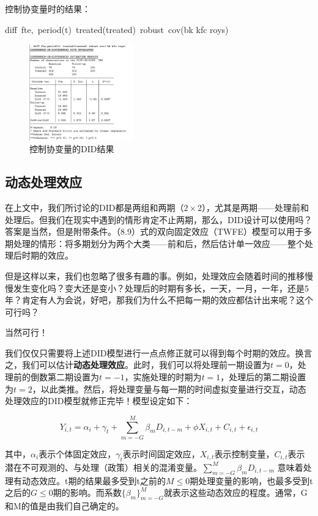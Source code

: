\documentclass[cn,12pt,math=newtx,citestyle=gb7714-2015,bibstyle=gb7714-2015]{elegantbook}
\begin{document}
	控制协变量时的结果：
	
	diff~fte,~period(t)~treated(treated)~robust~cov(bk kfc roys)
	\begin{figure}[htbp!]
		\centering
		\includegraphics[width=0.4\textwidth]{DIDcov.jpg}
		\caption{控制协变量的DID结果}\label{fig:digit}
	\end{figure}
	
	
	\subsection{动态处理效应}
	
	在上文中，我们所讨论的DID都是两组和两期（$2 \times 2$），尤其是两期——处理前和处理后。但我们在现实中遇到的情形肯定不止两期，那么，DID设计可以使用吗？答案是当然，但是附带条件。（8.9）式的双向固定效应（TWFE）模型可以用于多期处理的情形：将多期划分为两个大类——前和后，然后估计单一效应——整个处理后时期的效应。
	
	但是这样以来，我们也忽略了很多有趣的事。例如，处理效应会随着时间的推移慢慢发生变化吗？变大还是变小？处理后的时期有多长，一天，一月，一年，还是5年？肯定有人为会说，好吧，那我们为什么不把每一期的效应都估计出来呢？这个可行吗？
	
	当然可行！
	
	我们仅仅只需要将上述DID模型进行一点点修正就可以得到每个时期的效应。换言之，我们可以估计\textbf{动态处理效应}。此时，我们可以将处理前一期设置为$t=0$，处理前的倒数第二期设置为$t=-1$，实施处理的时期为$t=1$，处理后的第二期设置为$t=2$，以此类推。然后，将处理变量与每一期的时间虚拟变量进行交互，动态处理效应的DID模型就修正完毕！模型设定如下：
	
	\begin{equation}
		Y_{i,t} = \alpha_i + \gamma_t + \sum_{m = -G}^{M} \beta_m D_{i,t-m} + \phi X_{i,t} + C_{i,t} + \epsilon_{i,t}
	\end{equation}
	
	其中，$\alpha_i$表示个体固定效应，$\gamma_t$表示时间固定效应，$X_{i,t}$表示控制变量，$C_{i,t}$表示潜在不可观测的、与处理（政策）相关的混淆变量。$ \sum_{m = -G}^{M} \beta_m D_{i,t-m} $ 意味着处理有动态效应。t期的结果最多受到t之前的$M \le 0 $期处理变量的影响，也最多受到t之后的$G \le 0$期的影响。而系数$\{\beta_m\}_{m=-G}^{M}$就表示这些动态效应的程度。通常，G和M的值是由我们自己确定的。
	
\end{document}
